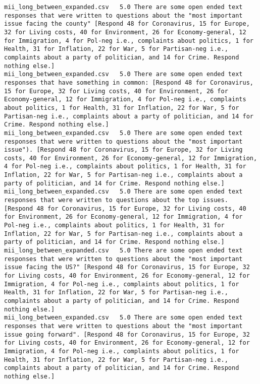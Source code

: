 \begin{lstlisting}[label=lst:promptvariants]
mii_long_between_expanded.csv	5.0	There are some open ended text responses that were written to questions about the "most important issue facing the county" [Respond 48 for Coronavirus, 15 for Europe, 32 for Living costs, 40 for Environment, 26 for Economy-general, 12 for Immigration, 4 for Pol-neg i.e., complaints about politics, 1 for Health, 31 for Inflation, 22 for War, 5 for Partisan-neg i.e., complaints about a party of politician, and 14 for Crime. Respond nothing else.]
mii_long_between_expanded.csv	5.0	There are some open ended text responses that have something in common: [Respond 48 for Coronavirus, 15 for Europe, 32 for Living costs, 40 for Environment, 26 for Economy-general, 12 for Immigration, 4 for Pol-neg i.e., complaints about politics, 1 for Health, 31 for Inflation, 22 for War, 5 for Partisan-neg i.e., complaints about a party of politician, and 14 for Crime. Respond nothing else.]
mii_long_between_expanded.csv	5.0	There are some open ended text responses that were written to questions about the "most important issue"). [Respond 48 for Coronavirus, 15 for Europe, 32 for Living costs, 40 for Environment, 26 for Economy-general, 12 for Immigration, 4 for Pol-neg i.e., complaints about politics, 1 for Health, 31 for Inflation, 22 for War, 5 for Partisan-neg i.e., complaints about a party of politician, and 14 for Crime. Respond nothing else.]
mii_long_between_expanded.csv	5.0	There are some open ended text responses that were written to questions about the top issues. [Respond 48 for Coronavirus, 15 for Europe, 32 for Living costs, 40 for Environment, 26 for Economy-general, 12 for Immigration, 4 for Pol-neg i.e., complaints about politics, 1 for Health, 31 for Inflation, 22 for War, 5 for Partisan-neg i.e., complaints about a party of politician, and 14 for Crime. Respond nothing else.]
mii_long_between_expanded.csv	5.0	There are some open ended text responses that were written to questions about the "most important issue facing the US?" [Respond 48 for Coronavirus, 15 for Europe, 32 for Living costs, 40 for Environment, 26 for Economy-general, 12 for Immigration, 4 for Pol-neg i.e., complaints about politics, 1 for Health, 31 for Inflation, 22 for War, 5 for Partisan-neg i.e., complaints about a party of politician, and 14 for Crime. Respond nothing else.]
mii_long_between_expanded.csv	5.0	There are some open ended text responses that were written to questions about the "most important issue going forward". [Respond 48 for Coronavirus, 15 for Europe, 32 for Living costs, 40 for Environment, 26 for Economy-general, 12 for Immigration, 4 for Pol-neg i.e., complaints about politics, 1 for Health, 31 for Inflation, 22 for War, 5 for Partisan-neg i.e., complaints about a party of politician, and 14 for Crime. Respond nothing else.]

\end{lstlisting}
